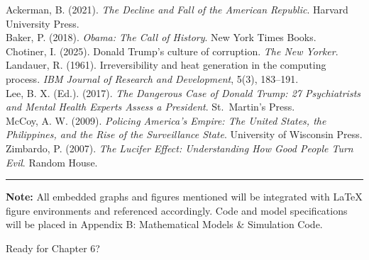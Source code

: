 Ackerman, B. (2021). \emph{The Decline and Fall of the American
Republic}. Harvard University Press.\\
Baker, P. (2018). \emph{Obama: The Call of History}. New York Times
Books.\\
Chotiner, I. (2025). Donald Trump's culture of corruption. \emph{The New
Yorker}.\\
Landauer, R. (1961). Irreversibility and heat generation in the
computing process. \emph{IBM Journal of Research and Development}, 5(3),
183--191.\\
Lee, B. X. (Ed.). (2017). \emph{The Dangerous Case of Donald Trump: 27
Psychiatrists and Mental Health Experts Assess a President}.
St.~Martin's Press.\\
McCoy, A. W. (2009). \emph{Policing America's Empire: The United States,
the Philippines, and the Rise of the Surveillance State}. University of
Wisconsin Press.\\
Zimbardo, P. (2007). \emph{The Lucifer Effect: Understanding How Good
People Turn Evil}. Random House.

\begin{center}\rule{0.5\linewidth}{0.5pt}\end{center}

\textbf{Note:} All embedded graphs and figures mentioned will be
integrated with LaTeX figure environments and referenced accordingly.
Code and model specifications will be placed in Appendix B: Mathematical
Models \& Simulation Code.

Ready for Chapter 6?
